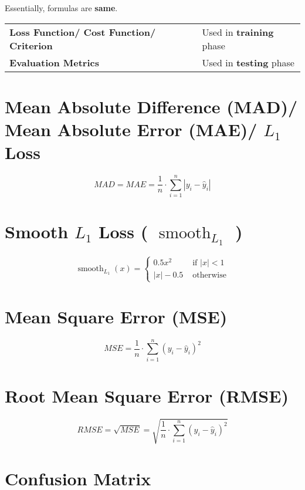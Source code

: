 Essentially, formulas are \textbf{same}.

\begin{table}[h]
    \begin{tabular}{l l}
        \textbf{Loss Function/ Cost Function/ Criterion} & Used in \textbf{training} phase \\
        
        \textbf{Evaluation Metrics} & Used in \textbf{testing} phase \\
    \end{tabular}
\end{table}


\section{Mean Absolute Difference (MAD)/ Mean Absolute Error (MAE)/ $L_1$ Loss}\label{Mean Absolute Difference (MAD)}\label{Mean Absolute Error (MAE)}\label{L1 Loss}

\[
    MAD = MAE = \displaystyle\frac{1}{n} \cdot \sum_{i=1}^{n} \left| y_i - \hat{y}_i \right|
\]

\section{Smooth $L_1$ Loss ( $\operatorname{smooth}_{L_1}$ )}
\[
    \displaystyle
    \operatorname{smooth}_{L_1}(x) = \begin{cases}
        0.5x^2 & \text{ if } |x| < 1 \\
        |x| - 0.5 & \text{ otherwise}
    \end{cases}
\]



\section{Mean Square Error (MSE)}\label{Mean Square Error (MSE)}
\[
    MSE = \displaystyle\frac{1}{n} \cdot \sum_{i=1}^{n} ( y_i - \hat{y}_i )^2
\]

\section{Root Mean Square Error (RMSE)}\label{Root Mean Square Error (RMSE)}
\[
    RMSE = \sqrt{MSE} = \displaystyle\sqrt{\frac{1}{n} \cdot \sum_{i=1}^{n} ( y_i - \hat{y}_i )^2}
\]


\section{Confusion Matrix}

